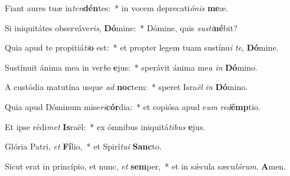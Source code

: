 Fiant aures tuæ in\textit{ten}\textbf{dén}tes:~* in vocem deprecati\textit{ó}\textit{nis} \textbf{me}æ.

Si iniquitátes observáve\textit{ris}, \textbf{Dó}mine:~* Dómine, quis \textit{sus}\textit{ti}\textbf{né}bit?

Quia apud te propitiá\textit{ti}\textbf{o} est:~* et propter legem tuam sustínu\textit{i} \textit{te}, \textbf{Dó}mine.

Sustínuit ánima mea in ver\textit{bo} \textbf{e}jus:~* sperávit ánima me\textit{a} \textit{in} \textbf{Dó}mino.

A custódia matutína usque \textit{ad} \textbf{noc}tem:~* speret Isra\textit{ël} \textit{in} \textbf{Dó}mino.

Quia apud Dóminum mise\textit{ri}\textbf{cór}dia:~* et copiósa apud e\textit{um} \textit{red}\textbf{émp}tio.

Et ipse rédi\textit{met} \textbf{Is}raël:~* ex ómnibus iniquitá\textit{ti}\textit{bus} \textbf{e}jus.

Glória Patri, \textit{et} \textbf{Fí}lio,~* et Spirí\textit{tu}\textit{i} \textbf{Sanc}to.

Sicut erat in princípio, et nunc, \textit{et} \textbf{sem}per,~* et in sǽcula sæcu\textit{ló}\textit{rum}. \textbf{A}men.


